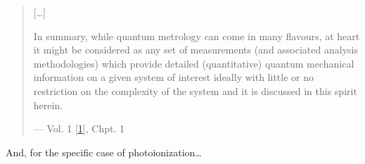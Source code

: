 \documentclass[letterpaper,table,10pt,english]{jupyterBook}
\begin{document}
\begin{quote}
\sphinxAtStartPar
{[}…{]}

\sphinxAtStartPar
In summary, while quantum metrology can come in many flavours, at heart it might be considered as any set of measurements (and associated analysis methodologies) which provide detailed (quantitative) quantum mechanical information on a given system of interest \sphinxhyphen{} ideally with little or no restriction on the complexity of the system \sphinxhyphen{} and it is discussed in this spirit herein.

\begin{flushright}
--- Vol. 1 {[}\hyperlink{cite.backmatter/bibliography:id569}{1}{]}, Chpt. 1
\end{flushright}
\end{quote}

\sphinxAtStartPar
And, for the specific case of photoionization…
\end{document}
